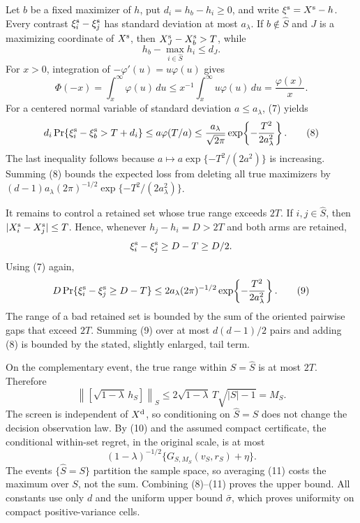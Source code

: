 Let \(b\) be a fixed maximizer of \(h\), put \(d_i=h_b-h_i\geq0\), and write \(\xi^{\rm s}=X^{\rm s}-h\).  Every contrast \(\xi_i^{\rm s}-\xi_j^{\rm s}\) has standard deviation at most \(a_\lambda\).  If \(b\notin\widehat S\) and \(J\) is a maximizing coordinate of \(X^{\rm s}\), then \(X_J^{\rm s}-X_b^{\rm s}>T\), while
\[
h_b-\max_{i\in\widehat S}h_i\leq d_J.
\]
For \(x>0\), integration of \(-\varphi'(u)=u\varphi(u)\) gives
\[
\Phi(-x)=\int_x^\infty\varphi(u)\,du
\leq x^{-1}\int_x^\infty u\varphi(u)\,du
=\frac{\varphi(x)}{x}. \tag{7}
\]
For a centered normal variable of standard deviation \(a\leq a_\lambda\), (7) yields
\[
d_i\Pr\{\xi_i^{\rm s}-\xi_b^{\rm s}>T+d_i\}
\leq a\varphi(T/a)
\leq \frac{a_\lambda}{\sqrt{2\pi}}
       \exp\!\left\{-\frac{T^2}{2a_\lambda^2}\right\}. \tag{8}
\]
The last inequality follows because \(a\mapsto a\exp\{-T^2/(2a^2)\}\) is increasing.  Summing (8) bounds the expected loss from deleting all true maximizers by \((d-1)a_\lambda(2\pi)^{-1/2}\exp\{-T^2/(2a_\lambda^2)\}\).

It remains to control a retained set whose true range exceeds \(2T\).  If \(i,j\in\widehat S\), then \(|X_i^{\rm s}-X_j^{\rm s}|\leq T\).  Hence, whenever \(h_j-h_i=D>2T\) and both arms are retained,
\[
\xi_i^{\rm s}-\xi_j^{\rm s}\geq D-T\geq D/2.
\]
Using (7) again,
\[
D\Pr\{\xi_i^{\rm s}-\xi_j^{\rm s}\geq D-T\}
\leq 2a_\lambda(2\pi)^{-1/2}
       \exp\!\left\{-\frac{T^2}{2a_\lambda^2}\right\}. \tag{9}
\]
The range of a bad retained set is bounded by the sum of the oriented pairwise gaps that exceed \(2T\).  Summing (9) over at most \(d(d-1)/2\) pairs and adding (8) is bounded by the stated, slightly enlarged, tail term.

On the complementary event, the true range within \(S=\widehat S\) is at most \(2T\).  Therefore
\[
\left\lVert\left[\sqrt{1-\lambda}\,h_S\right]\right\rVert_S
\leq2\sqrt{1-\lambda}\,T\sqrt{|S|-1}=M_S. \tag{10}
\]
The screen is independent of \(X^{\rm d}\), so conditioning on \(\widehat S=S\) does not change the decision observation law.  By (10) and the assumed compact certificate, the conditional within-set regret, in the original scale, is at most
\[
(1-\lambda)^{-1/2}\{G_{S,M_S}(v_S,r_S)+\eta\}. \tag{11}
\]
The events \(\{\widehat S=S\}\) partition the sample space, so averaging (11) costs the maximum over \(S\), not the sum.  Combining (8)--(11) proves the upper bound.  All constants use only \(d\) and the uniform upper bound \(\bar\sigma\), which proves uniformity on compact positive-variance cells.